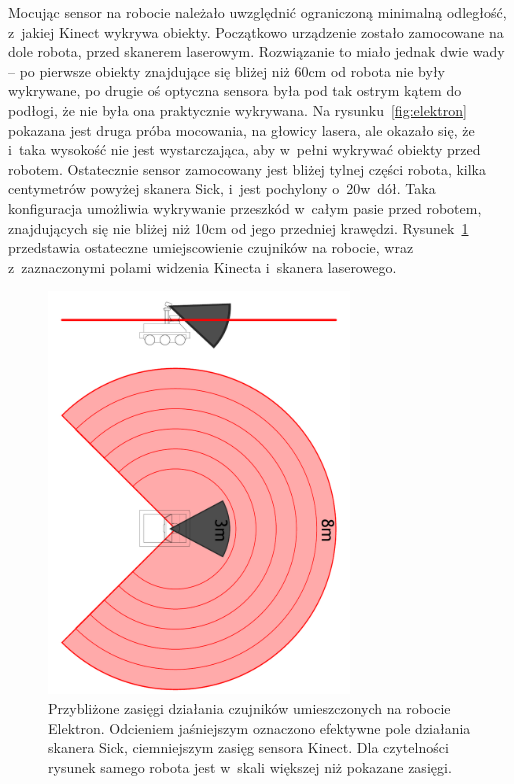 Mocując sensor na robocie należało uwzględnić ograniczoną minimalną odległość,
z~jakiej Kinect wykrywa obiekty. Początkowo urządzenie zostało zamocowane na
dole robota, przed skanerem laserowym. Rozwiązanie to miało jednak dwie wady --
po pierwsze obiekty znajdujące się bliżej niż 60cm od robota nie były
wykrywane, po drugie oś optyczna sensora była pod tak ostrym kątem do podłogi,
że nie była ona praktycznie wykrywana. Na rysunku~\ref{fig:elektron} pokazana
jest druga próba mocowania, na głowicy lasera, ale okazało się, że i~taka
wysokość nie jest wystarczająca, aby w~pełni wykrywać obiekty przed robotem.
Ostatecznie sensor zamocowany jest bliżej tylnej części robota, kilka
centymetrów powyżej skanera Sick, i~jest pochylony o~20\textdegree w~dół. Taka
konfiguracja umożliwia wykrywanie przeszkód w~całym pasie przed robotem,
znajdujących się nie bliżej niż 10cm od jego przedniej krawędzi.
Rysunek~\ref{fig:range} przedstawia ostateczne umiejscowienie czujników
na robocie, wraz z~zaznaczonymi polami widzenia Kinecta i~skanera laserowego.



\begin{figure}[htb!]
\centering
\includegraphics[width=8cm]{../../Common/img/elektron/range}
\caption[Przybliżone zasięgi działania czujników umieszczonych na robocie
Elektron]{Przybliżone zasięgi działania czujników umieszczonych na robocie
Elektron. Odcieniem jaśniejszym oznaczono efektywne pole działania skanera Sick,
ciemniejszym zasięg sensora Kinect. Dla czytelności rysunek samego robota
jest w~skali większej niż pokazane zasięgi.}
\label{fig:range}
\end{figure}


